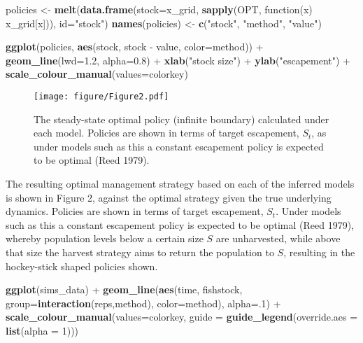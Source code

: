 \documentclass[author-year, review]{elsarticle} %
\makeatletter
\newenvironment{Shaded}{}{}
\newcommand{\KeywordTok}[1]{\textcolor[rgb]{0.00,0.44,0.13}{\textbf{{#1}}}}
\newcommand{\DataTypeTok}[1]{\textcolor[rgb]{0.56,0.13,0.00}{{#1}}}
\newcommand{\DecValTok}[1]{\textcolor[rgb]{0.25,0.63,0.44}{{#1}}}
\newcommand{\FloatTok}[1]{\textcolor[rgb]{0.25,0.63,0.44}{{#1}}}
\newcommand{\StringTok}[1]{\textcolor[rgb]{0.25,0.44,0.63}{{#1}}}
\newcommand{\NormalTok}[1]{{#1}}
\def\maxwidth{\ifdim\Gin@nat@width>\linewidth\linewidth
\else\Gin@nat@width\fi}
\let\Oldincludegraphics\includegraphics
\renewcommand{\includegraphics}[1]{\Oldincludegraphics[width=\maxwidth]{#1}}
\makeatother
\begin{document}
\begin{Shaded}
\begin{Highlighting}[]
\NormalTok{policies <- }\KeywordTok{melt}\NormalTok{(}\KeywordTok{data.frame}\NormalTok{(}\DataTypeTok{stock=}\NormalTok{x_grid, }\KeywordTok{sapply}\NormalTok{(OPT, function(x) x_grid[x])), }\DataTypeTok{id=}\StringTok{"stock"}\NormalTok{)}
\KeywordTok{names}\NormalTok{(policies) <- }\KeywordTok{c}\NormalTok{(}\StringTok{"stock"}\NormalTok{, }\StringTok{"method"}\NormalTok{, }\StringTok{"value"}\NormalTok{)}

\KeywordTok{ggplot}\NormalTok{(policies, }\KeywordTok{aes}\NormalTok{(stock, stock - value, }\DataTypeTok{color=}\NormalTok{method)) +}
  \KeywordTok{geom_line}\NormalTok{(}\DataTypeTok{lwd=}\FloatTok{1.2}\NormalTok{, }\DataTypeTok{alpha=}\FloatTok{0.8}\NormalTok{) + }\KeywordTok{xlab}\NormalTok{(}\StringTok{"stock size"}\NormalTok{) + }\KeywordTok{ylab}\NormalTok{(}\StringTok{"escapement"}\NormalTok{)  +}
  \KeywordTok{scale_colour_manual}\NormalTok{(}\DataTypeTok{values=}\NormalTok{colorkey)}
\end{Highlighting}
\end{Shaded}

\begin{figure}[htbp]
\centering
\texttt{[image: figure/Figure2.pdf]}
\caption{The steady-state optimal policy (infinite boundary) calculated
under each model. Policies are shown in terms of target escapement,
$S_t$, as under models such as this a constant escapement policy is
expected to be optimal (Reed 1979).}
\end{figure}

The resulting optimal management strategy based on each of the inferred
models is shown in Figure 2, against the optimal strategy given the true
underlying dynamics. Policies are shown in terms of target escapement,
$S_t$. Under models such as this a constant escapement policy is
expected to be optimal (Reed 1979), whereby population levels below a
certain size $S$ are unharvested, while above that size the harvest
strategy aims to return the population to $S$, resulting in the
hockey-stick shaped policies shown.

\begin{Shaded}
\begin{Highlighting}[]
\KeywordTok{ggplot}\NormalTok{(sims_data) + }
  \KeywordTok{geom_line}\NormalTok{(}\KeywordTok{aes}\NormalTok{(time, fishstock, }\DataTypeTok{group=}\KeywordTok{interaction}\NormalTok{(reps,method), }\DataTypeTok{color=}\NormalTok{method), }\DataTypeTok{alpha=}\NormalTok{.}\DecValTok{1}\NormalTok{) +}
  \KeywordTok{scale_colour_manual}\NormalTok{(}\DataTypeTok{values=}\NormalTok{colorkey, }\DataTypeTok{guide =} \KeywordTok{guide_legend}\NormalTok{(}\DataTypeTok{override.aes =} \KeywordTok{list}\NormalTok{(}\DataTypeTok{alpha =} \DecValTok{1}\NormalTok{)))}
\end{Highlighting}
\end{Shaded}
\end{document}
